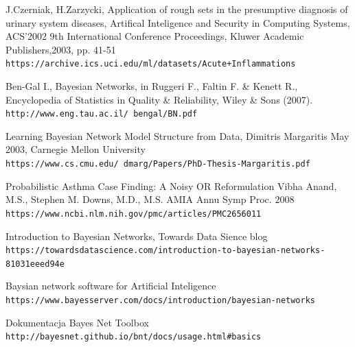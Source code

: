 \documentclass{article}
\begin{document}
\newpage
\begin{thebibliography}{9}

J.Czerniak, H.Zarzycki, Application of rough sets in the presumptive diagnosis of urinary system diseases, 
Artifical Inteligence and Security in Computing Systems, ACS'2002 9th International Conference Proceedings, 
Kluwer Academic Publishers,2003, pp. 41-51 
\\\texttt{https://archive.ics.uci.edu/ml/datasets/Acute+Inflammations}

Ben-Gal I., Bayesian Networks, in Ruggeri F., Faltin F. \& Kenett R.,
Encyclopedia of Statistics in Quality \& Reliability, Wiley \& Sons (2007). 
\\\texttt{http://www.eng.tau.ac.il/~bengal/BN.pdf}

Learning Bayesian Network Model Structure from Data, Dimitris Margaritis
May 2003, Carnegie Mellon University
\\\texttt{https://www.cs.cmu.edu/~dmarg/Papers/PhD-Thesis-Margaritis.pdf}

Probabilistic Asthma Case Finding: A Noisy OR Reformulation
Vibha Anand, M.S., Stephen M. Downs, M.D., M.S.
AMIA Annu Symp Proc. 2008
\\\texttt{https://www.ncbi.nlm.nih.gov/pmc/articles/PMC2656011}

Introduction to Bayesian Networks, Towards Data Sience blog
\\\texttt{https://towardsdatascience.com/introduction-to-bayesian-networks-81031eeed94e}

Baysian network software for Artificial Inteligence
\\\texttt{https://www.bayesserver.com/docs/introduction/bayesian-networks}

Dokumentacja Bayes Net Toolbox
\\\texttt{http://bayesnet.github.io/bnt/docs/usage.html\#basics}

\end{thebibliography}
\newpage

\listoffigures
\newpage

\listoftables
\newpage
\end{document}
